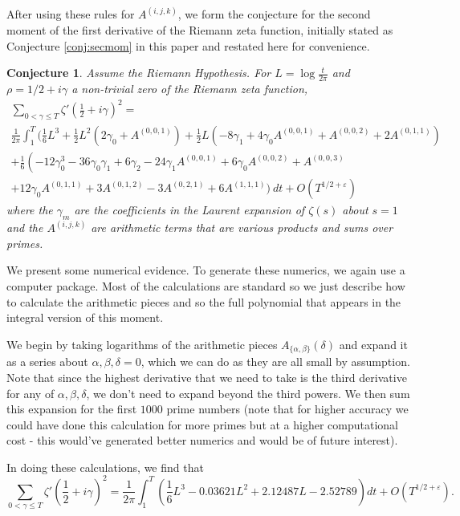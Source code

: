 \documentclass[12pt,a4paper,reqno]{amsart}
\newtheorem*{conjecture*}{Conjecture}
\theoremstyle{remark}
\numberwithin{equation}{section}
\begin{document}
After using these rules for $A^{(i,j,k)}$, we form the conjecture for the second moment of the first derivative of the Riemann zeta function, initially stated as Conjecture \ref{conj:secmom} in this paper and restated here for convenience.

\begin{conjecture*}
    Assume the Riemann Hypothesis. For $L = \log \frac{t}{2\pi}$ and $\rho=1/2 + i\gamma$ a non-trivial zero of the Riemann zeta function,
\begin{multline*}
\sum_{0 < \gamma \leq T} \zeta ' \left(\frac{1}{2} + i \gamma \right)^2 = \\
\frac{1}{2 \pi} \int_{1}^{T} \Big( \frac{1}{6}L^3 + \frac{1}{2}L^2 \left(2\gamma_0 +A^{(0,0,1)}  \right)  + \frac{1}{2} L \left( -8\gamma_1 + 4\gamma_0 A^{(0,0,1)} + A^{(0,0,2)}  + 2A^{(0,1,1)} \right) \\
+ \frac{1}{6} \left( -12\gamma_0^3 - 36\gamma_0 \gamma_1 + 6\gamma_2 -24 \gamma_1 A^{(0,0,1)} + 6 \gamma_0 A^{(0,0,2)} + A^{(0,0,3)}  \right. \\
  + 12 \gamma_0 A^{(0,1,1)} + 3 A^{(0,1,2)} -3 A^{(0,2,1)} +6 A^{(1,1,1)}  \Big) \ dt + O\left( T^{1/2 +\varepsilon} \right)
\end{multline*}
where the $\gamma_m$ are the coefficients in the Laurent expansion of $\zeta (s)$ about $s=1$ and the $A^{(i,j,k)}$ are arithmetic terms that are various products and sums over primes.
\end{conjecture*}

We present some numerical evidence. To generate these numerics, we again use a computer package. Most of the calculations are standard so we just describe how to calculate the arithmetic pieces and so the full polynomial that appears in the integral version of this moment.

We begin by taking logarithms of the arithmetic pieces $A_{\{\alpha, \beta\}}(\delta)$ and expand it as a series about $\alpha,\beta,\delta=0$, which we can do as they are all small by assumption. Note that since the highest derivative that we need to take is the third derivative for any of $\alpha,\beta,\delta$, we don't need to expand beyond the third powers. We then sum this expansion for the first $1000$ prime numbers (note that for higher accuracy we could have done this calculation for more primes but at a higher computational cost - this would've generated better numerics and would be of future interest).

In doing these calculations, we find that
\begin{equation*}
\sum_{0 < \gamma \leq T} \zeta ' \left(\frac{1}{2} + i \gamma \right)^2 = \frac{1}{2 \pi} \int_{1}^{T} \left( \frac{1}{6}L^3 - 0.03621 L^2 + 2.12487 L  -2.52789 \right) dt + O\left( T^{1/2 +\varepsilon} \right).
\end{equation*}
\end{document}
